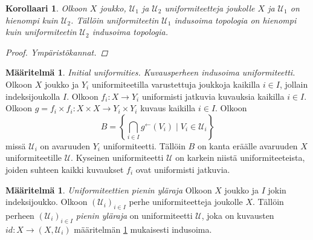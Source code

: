 \documentclass[12pt,a4paper,leqno]{report}
\newcommand{\U}{\mathcal{U}}
\theoremstyle{plain}
\newtheorem{kor}[equation]{Korollaari}
\theoremstyle{definition}
\newtheorem{maar}[equation]{Määritelmä}
\theoremstyle{remark}
\begin{document}
\begin{kor}
Olkoon $X$ joukko, $\U_1$ ja $\U_2$ uniformiteetteja joukolle $X$ ja 
$\U_1$ on hienompi kuin $\U_2$. Tällöin uniformiteetin $\U_1$ indusoima topologia on hienompi kuin uniformiteetin $\U_2$ indusoima topologia.
\begin{proof}
Ympäristökannat.
\end{proof}
\end{kor}
\begin{maar}\label{kuvausperheen indusoima}
\emph{Initial uniformities. Kuvausperheen indusoima uniformiteetti.} 
Olkoon $X$ joukko ja $Y_i$ uniformiteetilla varustettuja joukkoja kaikilla $i\in I$, jollain indeksijoukolla $I$. 
Olkoon $f_i\colon X\rightarrow Y_i$ uniformisti jatkuvia kuvauksia kaikilla $i\in I$. 
Olkoon $g=f_i\times f_i\colon X\times X\rightarrow Y_i\times Y_i$ %
kuvaus kaikilla $i\in I$.
Olkoon $$B=\left\{\bigcap_{i\in I}g^{\leftarrow}(V_i)\mid V_i \in\U_i \right\}$$
missä $\U_i$ on avaruuden $Y_i$ uniformiteetti.
Tällöin $B$ on kanta eräälle avaruuden $X$ uniformiteetille $\U$. 
Kyseinen uniformiteetti $\U$ on karkein niistä uniformiteeteista, joiden suhteen kaikki kuvaukset $f_i$ ovat uniformisti jatkuvia.
\end{maar}
\begin{maar}
\emph{Uniformiteettien pienin yläraja}
Olkoon $X$ joukko ja $I$ jokin indeksijoukko.
Olkoon $(\U_i)_{i\in I}$ perhe uniformiteetteja joukolle $X$.
Tällöin perheen $(\U_i)_{i\in I}$ \emph{pienin yläraja} on uniformiteetti $\U$, joka on kuvausten $id\colon X\rightarrow (X,\U_i)$ määritelmän \ref{kuvausperheen indusoima} mukaisesti indusoima.
\end{maar}
\end{document}
